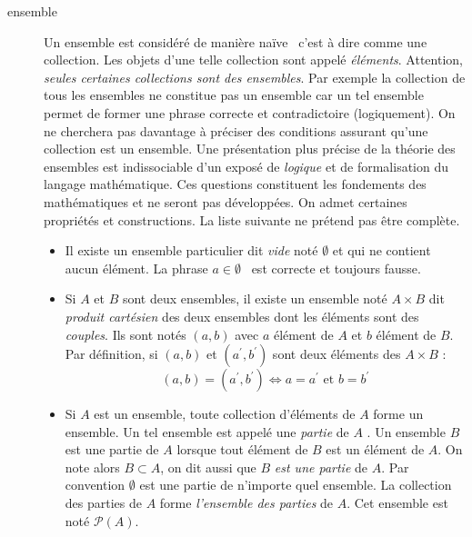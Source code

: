 \begin{description}
\item[ensemble] Un ensemble est considéré de manière \og naïve\fg~ c'est à dire comme une collection. Les objets d'une telle collection sont appelé \emph{éléments}. Attention, \emph{seules certaines collections sont des ensembles}. Par exemple la collection de tous les ensembles ne constitue pas un ensemble car un tel ensemble permet de former une phrase correcte et contradictoire (logiquement). On ne cherchera pas davantage à préciser des conditions assurant qu'une collection est un ensemble.\newline
Une présentation plus précise de la théorie des ensembles est indissociable d'un exposé de \emph{logique} et de formalisation du langage mathématique. Ces questions constituent les fondements des mathématiques et ne seront pas développées. \newline
On admet certaines propriétés et constructions. La liste suivante ne prétend pas être complète.
\begin{itemize}
 \item Il existe un ensemble particulier dit \emph{vide} noté $\emptyset$ et qui ne contient aucun élément. La phrase \og$a\in \emptyset$\fg~ est correcte et toujours fausse.
\item  Si $A$ et $B$ sont deux ensembles, il existe un ensemble noté $A\times B$ dit \emph{produit cartésien} des deux ensembles dont les éléments sont des \emph{couples}. Ils sont notés $(a,b)$ avec $a$ élément de $A$ et $b$ élément de $B$. Par définition, si $(a,b)$ et $(a^\prime,b^\prime )$ sont deux éléments des $A\times B$ :
\begin{displaymath}
 (a,b) = (a^\prime,b^\prime ) \Leftrightarrow a=a^\prime \text{ et } b=b^\prime
\end{displaymath}
\item Si $A$ est un ensemble, toute collection d'éléments de $A$ forme un ensemble. Un tel ensemble est appelé une \emph{partie} de $A$ . Un ensemble $B$ est une partie de $A$ lorsque tout élément de $B$ est un élément de $A$. On note alors $B \subset A$, on dit aussi que $B$ \emph{est une partie} de $A$. Par convention $\emptyset$ est une partie de n'importe quel ensemble.\newline
La collection des parties de $A$ forme \emph{l'ensemble des parties} de $A$. Cet ensemble est noté $\mathcal P (A)$.
\end{itemize}


\end{description}
